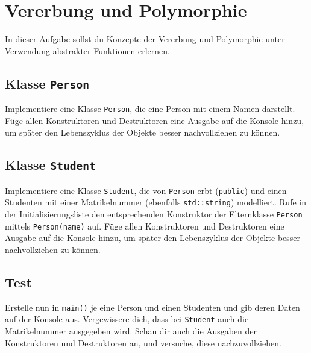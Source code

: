 \section{\ExercisePrefixObjectOrientation Vererbung und Polymorphie}\label{sec:inheritance}
In dieser Aufgabe sollst du Konzepte der Vererbung und Polymorphie unter Verwendung abstrakter Funktionen erlernen.

\subsection{Klasse \lstinline{Person}}
Implementiere eine Klasse \lstinline{Person}, die eine Person mit einem Namen darstellt.
Füge allen Konstruktoren und Destruktoren eine Ausgabe auf die Konsole hinzu, um später den Lebenszyklus der Objekte besser nachvollziehen zu können.




\subsection{Klasse \lstinline{Student}}
Implementiere eine Klasse \lstinline{Student}, die von \lstinline{Person} erbt (\lstinline{public}) und einen Studenten mit einer Matrikelnummer (ebenfalls \lstinline{std::string}) modelliert.
Rufe in der Initialisierungsliste den entsprechenden Konstruktor der Elternklasse \lstinline{Person} mittels \lstinline{Person(name)} auf.
Füge allen Konstruktoren und Destruktoren eine Ausgabe auf die Konsole hinzu, um später den Lebenszyklus der Objekte besser nachvollziehen zu können.




\subsection{Test}
Erstelle nun in \lstinline{main()} je eine Person und einen Studenten und gib deren Daten auf der Konsole aus.
Vergewissere dich, dass bei \lstinline{Student} auch die Matrikelnummer ausgegeben wird.
Schau dir auch die Ausgaben der Konstruktoren und Destruktoren an, und versuche, diese nachzuvollziehen.

